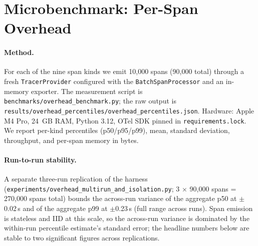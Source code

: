 \documentclass[sigplan,10pt,anonymous,review]{acmart}
\begin{document}
\section{Microbenchmark: Per-Span Overhead}
\label{sec:microbench}

\paragraph{Method.} For each of the nine span kinds we emit 10{,}000
spans (90{,}000 total) through a fresh
\texttt{TracerProvider} configured with the
\texttt{BatchSpanProcessor} and an in-memory exporter. The
measurement script is
\texttt{benchmarks/overhead\_benchmark.py}; the raw output is
\texttt{results/overhead\_percentiles/overhead\_percentiles.json}.
Hardware: Apple M4 Pro, 24~GB RAM, Python 3.12, OTel SDK pinned in
\texttt{requirements.lock}. We report per-kind percentiles
(p50/p95/p99), mean, standard deviation, throughput, and per-span
memory in bytes.

\paragraph{Run-to-run stability.} A separate three-run replication of
the harness (\texttt{experiments/overhead\_multirun\_and\_isolation.py};
3 $\times$ 90{,}000 spans = 270{,}000 spans total) bounds the
across-run variance of the aggregate p50 at $\pm$0.02\,\textmu{}s and
of the aggregate p99 at $\pm$0.23\,\textmu{}s (full range across runs).
Span emission is stateless and IID at this scale, so the across-run
variance is dominated by the within-run percentile estimate's standard
error; the headline numbers below are stable to two significant
figures across replications.
\end{document}
